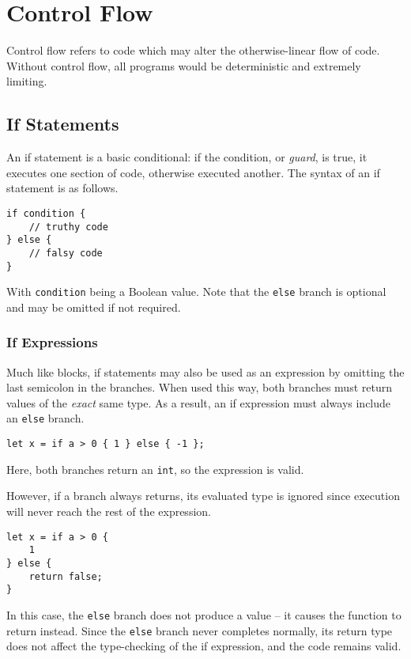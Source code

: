 \section{Control Flow}\label{sec:control-flow}

Control flow refers to code which may alter the otherwise-linear flow of code.
Without control flow, all programs would be deterministic and extremely limiting.

\subsection{If Statements}

An if statement is a basic conditional: if the condition, or \textit{guard}, is true, it executes one section of code, otherwise executed another.
The syntax of an if statement is as follows.

\begin{lstlisting}[language=CustomLang]
if condition {
    // truthy code
} else {
    // falsy code
}
\end{lstlisting}

With \texttt{condition} being a Boolean value.
Note that the \texttt{else} branch is optional and may be omitted if not required.

\subsubsection{If Expressions}

Much like blocks, if statements may also be used as an expression by omitting the last semicolon in the branches.
When used this way, both branches must return values of the \textit{exact} same type.
As a result, an if expression must always include an \texttt{else} branch.

\begin{lstlisting}[language=CustomLang]
let x = if a > 0 { 1 } else { -1 };
\end{lstlisting}

Here, both branches return an \texttt{int}, so the expression is valid.

However, if a branch always returns, its evaluated type is ignored since execution will never reach the rest of the expression.

\begin{lstlisting}[language=CustomLang]
let x = if a > 0 {
    1
} else {
    return false;
}
\end{lstlisting}

In this case, the \texttt{else} branch does not produce a value -- it causes the function to return instead.
Since the \texttt{else} branch never completes normally, its return type does not affect the type-checking of the if expression, and the code remains valid.

